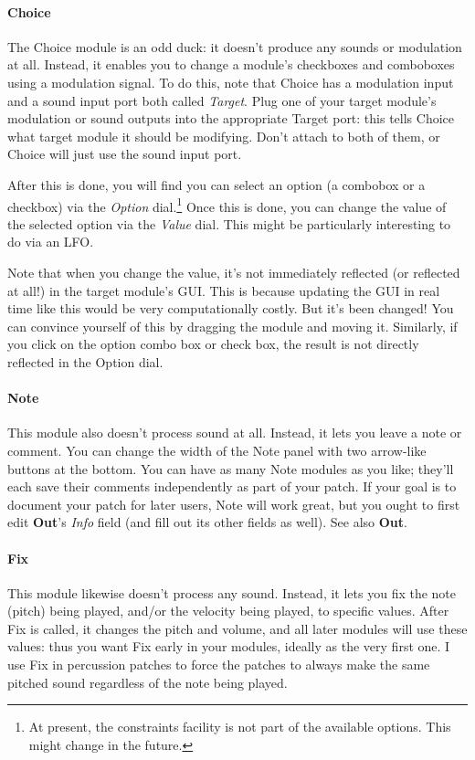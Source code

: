\documentclass{article}
\begin{document}
\paragraph{Choice}  The Choice module is an odd duck: it doesn't produce any sounds or modulation at all.  Instead, it enables you to change a module's checkboxes and comboboxes using a modulation signal.  To do this, note that Choice has a modulation input and a sound input port both called {\it Target}.   Plug one of your target module's modulation or sound outputs into the appropriate Target port: this tells Choice what target module it should be modifying.  Don't attach to both of them, or Choice will just use the sound input port.

After this is done, you will find you can select an option (a combobox or a checkbox) via the {\it Option} dial.\footnote{At present, the constraints facility is not part of the available options.  This might change in the future.} Once this is done, you can change the value of the selected option via the {\it Value} dial.  This might be particularly interesting to do via an LFO.

Note that when you change the value, it's not immediately reflected (or reflected at all!) in the target module's GUI.  This is because updating the GUI in real time like this would be very computationally costly.  But it's been changed!  You can convince yourself of this by dragging the module and moving it.  Similarly, if you click on the option combo box or check box, the result is not directly reflected in the Option dial.

\paragraph{Note} This module also doesn't process sound at all. Instead, it lets you leave a note or comment.  You can change the width of the Note panel with two arrow-like buttons at the bottom.   You can have as many Note modules as you like; they'll each save their comments independently as part of your patch.  If your goal is to document your patch for later users, Note will work great, but you ought to first edit {\bf Out}'s {\it Info} field (and fill out its other fields as well).  See also {\bf Out}.

\paragraph{Fix} This module likewise doesn't process any sound.  Instead, it lets you fix the note (pitch) being played, and/or the velocity being played, to specific values.  After Fix is called, it changes the pitch and volume, and all later modules will use these values: thus you want Fix early in your modules, ideally as the very first one.  I use Fix in percussion patches to force the patches to always make the same pitched sound regardless of the note being played.
\end{document}
